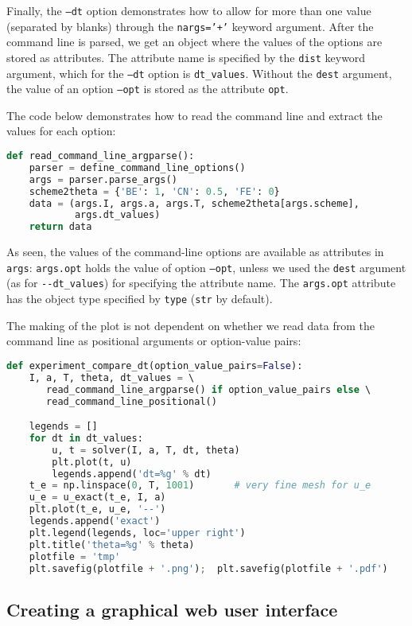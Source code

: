 \documentclass[graybox,sectrefs,envcountresetchap,open=right,final]{svmonodo}
\begin{document}
Finally, the \texttt{--dt} option demonstrates how to allow for more than one
value (separated by blanks) through the \texttt{nargs='+'} keyword argument.
After the command line is parsed, we get an object where the values of
the options are stored as attributes. The attribute name is specified
by the \texttt{dist} keyword argument, which for the \texttt{--dt} option is
\Verb!dt_values!. Without the \texttt{dest} argument, the value of an option \texttt{--opt}
is stored as the attribute \texttt{opt}.

The code below demonstrates how to read the command line and extract
the values for each option:

\begin{lstlisting}[language=Python,style=blue1_bluegreen]
def read_command_line_argparse():
    parser = define_command_line_options()
    args = parser.parse_args()
    scheme2theta = {'BE': 1, 'CN': 0.5, 'FE': 0}
    data = (args.I, args.a, args.T, scheme2theta[args.scheme],
            args.dt_values)
    return data
\end{lstlisting}
As seen, the values of the command-line options are available as
attributes in \texttt{args}: \texttt{args.opt} holds the value of option \texttt{--opt}, unless
we used the \texttt{dest} argument (as for \Verb!--dt_values!) for specifying the
attribute name. The \texttt{args.opt} attribute has the object type specified
by \texttt{type} (\texttt{str} by default).

The making of the plot is not dependent on whether we read data from
the command line as positional arguments or option-value pairs:

\begin{lstlisting}[language=Python,style=blue1_bluegreen]
def experiment_compare_dt(option_value_pairs=False):
    I, a, T, theta, dt_values = \ 
       read_command_line_argparse() if option_value_pairs else \ 
       read_command_line_positional()

    legends = []
    for dt in dt_values:
        u, t = solver(I, a, T, dt, theta)
        plt.plot(t, u)
        legends.append('dt=%g' % dt)
    t_e = np.linspace(0, T, 1001)       # very fine mesh for u_e
    u_e = u_exact(t_e, I, a)
    plt.plot(t_e, u_e, '--')
    legends.append('exact')
    plt.legend(legends, loc='upper right')
    plt.title('theta=%g' % theta)
    plotfile = 'tmp'
    plt.savefig(plotfile + '.png');  plt.savefig(plotfile + '.pdf')
\end{lstlisting}


\subsection{Creating a graphical web user interface}
\end{document}
